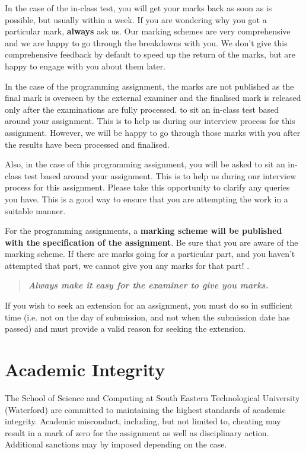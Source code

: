 \documentclass{article}
\begin{document}
In the case of the in-class test, you will get your marks back as soon as is possible, but usually within a week. 
If you are wondering why you got a particular mark, \textbf{always} ask us. Our marking schemes are very comprehensive and 
we are happy to go through the breakdowns with you. 
We don't give this comprehensive feedback by default to speed up the return of the marks, but are happy to engage with you  about them later. 

In the case of the programming  assignment, the marks are not published as the final mark is overseen by the external examiner and the 
finalised mark is released only after the examinations are fully processed.
to sit an in-class test based around your assignment. This is to help us during our interview process for this assignment. 
However, we will be happy to go through those marks with you 
after the results have been processed and finalised. 

Also, in the case of this programming assignment, you will be asked 
to sit an in-class test based around your assignment. This is to help us during our interview process for this assignment. 
Please take this opportunity to clarify any queries you have. This is a good way to ensure that 
you are attempting the work in a suitable manner.


For the programming assignments, a \textbf{marking scheme will be published with the specification of the assignment}. Be sure that you are aware of the marking scheme. 
If there are marks going for a particular part, and you haven't attempted that part, we cannot give you any marks for that part! . 
\begin{quote}
 \textbf{\textit{Always make it easy for the examiner to give you marks.}}
\end{quote}

If you wish to seek an extension for an assignment, you must do so in sufficient time (i.e. not on the day of submission, and not 
when the submission date has passed) and must provide a valid reason for seeking the extension. 


\section{Academic Integrity}
The School of Science and Computing  at South Eastern Technological University (Waterford) are  committed to maintaining the highest standards of academic integrity. 
Academic misconduct, including, but not limited to, 
cheating may result in a mark of zero for the assignment as well as disciplinary action.
 Additional sanctions may by imposed depending on the case. 
\end{document}
